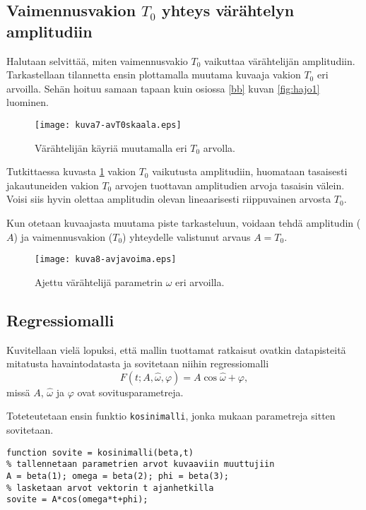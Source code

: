 \documentclass[a4paper,11pt]{article}
\begin{document}
\subsection{Vaimennusvakion $T_0$ yhteys värähtelyn amplitudiin}

Halutaan selvittää, miten vaimennusvakio $T_0$ vaikuttaa värähtelijän amplitudiin. Tarkastellaan tilannetta ensin plottamalla muutama kuvaaja vakion $T_0$ eri arvoilla. Sehän hoituu samaan tapaan kuin osiossa \ref{bb} kuvan \ref{fig:hajo1} luominen.

\begin{figure}
    \centering
    \texttt{[image: kuva7-avT0skaala.eps]}
    \caption{Värähtelijän käyriä muutamalla eri $T_0$ arvolla.}
    \label{fig:osc3}
\end{figure}

Tutkittaessa kuvasta \ref{fig:osc3} vakion $T_0$ vaikutusta amplitudiin, huomataan tasaisesti jakautuneiden vakion $T_0$ arvojen tuottavan amplitudien arvoja tasaisin välein. Voisi siis hyvin olettaa amplitudin olevan lineaarisesti riippuvainen arvosta $T_0$.

Kun otetaan kuvaajasta muutama piste tarkasteluun, voidaan tehdä amplitudin ($A$) ja vaimennusvakion ($T_0$) yhteydelle valistunut arvaus $A=T_0$.

\begin{figure}
    \centering
    \texttt{[image: kuva8-avjavoima.eps]}
    \caption{Ajettu värähtelijä parametrin $\omega$ eri arvoilla.}
    \label{fig:ocs2}
\end{figure}

\subsection{Regressiomalli}
\label{taydennys2}

Kuvitellaan vielä lopuksi, että mallin tuottamat ratkaisut ovatkin datapisteitä mitatusta havaintodatasta ja sovitetaan niihin regressiomalli
\begin{equation*}
    F(t;A,\hat{\omega},\varphi)=A\cos{\hat{\omega}+\varphi},
\end{equation*}
missä $A$, $\hat{\omega}$ ja $\varphi$ ovat sovitusparametreja.

Toteteutetaan ensin funktio \texttt{kosinimalli}, jonka mukaan parametreja sitten sovitetaan.

\begin{lstlisting}
function sovite = kosinimalli(beta,t)
% tallennetaan parametrien arvot kuvaaviin muuttujiin
A = beta(1); omega = beta(2); phi = beta(3);
% lasketaan arvot vektorin t ajanhetkilla
sovite = A*cos(omega*t+phi);
\end{lstlisting}
\end{document}
